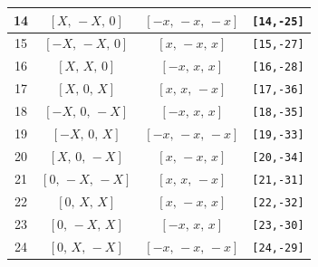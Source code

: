 \documentclass[fleqn,8pt]{jsarticle}
\begin{document}
\begin{longtable}{cccc}
14 & $\left[ X,\, - X,\, 0 \right]$ & $\left[ - x,\, - x,\, - x \right]$ & {\tt [14,-25]} \\ \hline
15 & $\left[ - X,\, - X,\, 0 \right]$ & $\left[ x,\, - x,\, x \right]$ & {\tt [15,-27]} \\ \hline
16 & $\left[ X,\, X,\, 0 \right]$ & $\left[ - x,\, x,\, x \right]$ & {\tt [16,-28]} \\ \hline
17 & $\left[ X,\, 0,\, X \right]$ & $\left[ x,\, x,\, - x \right]$ & {\tt [17,-36]} \\ \hline
18 & $\left[ - X,\, 0,\, - X \right]$ & $\left[ - x,\, x,\, x \right]$ & {\tt [18,-35]} \\ \hline
19 & $\left[ - X,\, 0,\, X \right]$ & $\left[ - x,\, - x,\, - x \right]$ & {\tt [19,-33]} \\ \hline
20 & $\left[ X,\, 0,\, - X \right]$ & $\left[ x,\, - x,\, x \right]$ & {\tt [20,-34]} \\ \hline
21 & $\left[ 0,\, - X,\, - X \right]$ & $\left[ x,\, x,\, - x \right]$ & {\tt [21,-31]} \\ \hline
22 & $\left[ 0,\, X,\, X \right]$ & $\left[ x,\, - x,\, x \right]$ & {\tt [22,-32]} \\ \hline
23 & $\left[ 0,\, - X,\, X \right]$ & $\left[ - x,\, x,\, x \right]$ & {\tt [23,-30]} \\ \hline
24 & $\left[ 0,\, X,\, - X \right]$ & $\left[ - x,\, - x,\, - x \right]$ & {\tt [24,-29]} \\
\end{longtable}
\renewcommand{\arraystretch}{1.2}
\end{document}
